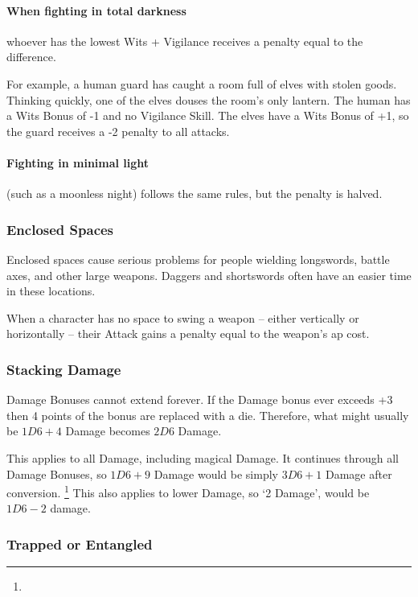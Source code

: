 \begin{multicols}{2}
\paragraph*{When fighting in total darkness}
whoever has the lowest Wits + Vigilance receives a penalty equal to the difference.

For example, a human guard has caught a room full of elves with stolen goods.
Thinking quickly, one of the elves douses the room's only lantern.
The human has a Wits Bonus of -1 and no Vigilance Skill.
The elves have a Wits Bonus of +1, so the guard receives a -2 penalty to all attacks.

\paragraph*{Fighting in minimal light}
(such as a moonless night)
follows the same rules, but the penalty is halved.

\subsubsection[Enclosed Spaces: Penalty equals weapon's AP cost]{Enclosed Spaces}
\label{enclosedcombat}

Enclosed spaces cause serious problems for people wielding longswords, battle axes, and other large weapons.
Daggers and shortswords often have an easier time in these locations.

When a character has no space to swing a weapon -- either vertically or horizontally -- their Attack gains a penalty equal to the weapon's \gls{ap} cost.

\subsubsection{Stacking Damage}

Damage Bonuses cannot extend forever. If the Damage bonus ever exceeds +3 then 4 points of the bonus are replaced with a die. Therefore, what might usually be $1D6+4$ Damage becomes $2D6$ Damage.

This applies to all Damage, including magical Damage.
It continues through all Damage Bonuses, so $1D6+9$ Damage would be simply $3D6+1$ Damage after conversion.%
\footnote{\stackingDamageChart}
This also applies to lower Damage, so `2 Damage', would be $1D6-2$ damage.

\subsubsection[Trapped/ Entangled: Character cannot use their Dexterity Bonus, and takes -2 Attack penalty]{Trapped or Entangled}
\label{trapped}
\label{entangled}


\end{multicols}
